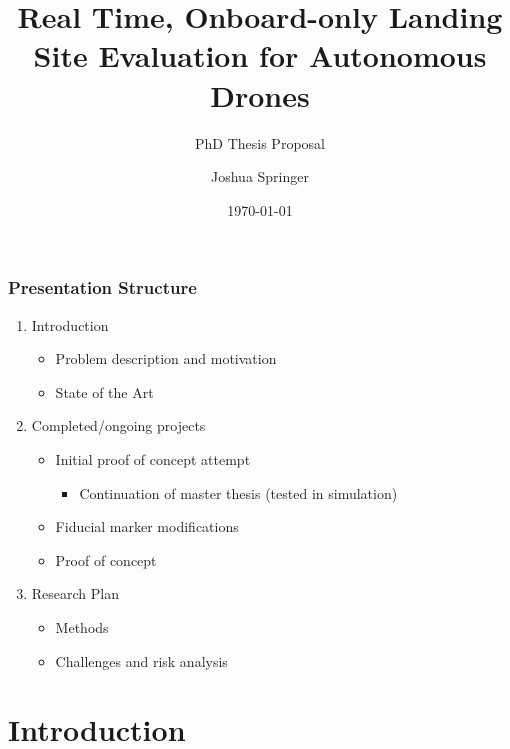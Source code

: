 \documentclass[aspectratio=169]{rubeamer}
\title[PhD Thesis Proposal]{Real Time, Onboard-only Landing Site Evaluation for Autonomous Drones}
\subtitle[demo]{PhD Thesis Proposal}
\author[Springer]{Joshua Springer}
\institute[RU]{Reykjavík University}
\date[2022]{\monthyeardate\today}%
\begin{document}

\begin{frame}[plain]%
  \titlepage

\end{frame}

\begin{frame}
  \frametitle{Presentation Structure}
  \begin{enumerate}
    \item Introduction
      \begin{itemize}
        \item Problem description and motivation
        \item State of the Art
      \end{itemize}
    \item Completed/ongoing projects
      \begin{itemize}
        \item Initial proof of concept attempt
          \begin{itemize}
            \item Continuation of master thesis (tested in simulation)
          \end{itemize}
        \item Fiducial marker modifications
        \item Proof of concept
      \end{itemize}
    \item Research Plan
      \begin{itemize}
        \item Methods
        \item Challenges and risk analysis
      \end{itemize}
  \end{enumerate}
\end{frame}

\section{Introduction}
\end{document}
